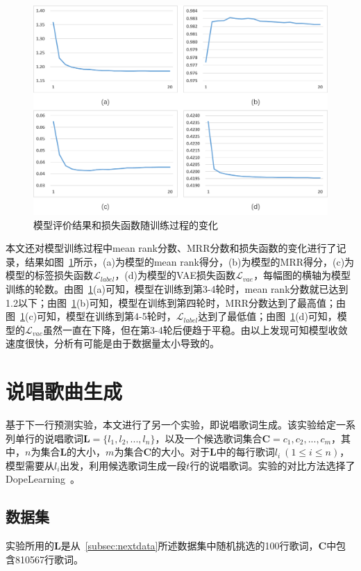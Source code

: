 \begin{figure}[h]
    \centering
    \includegraphics[width=14cm]{epoch.png}
    \caption{模型评价结果和损失函数随训练过程的变化}
    \label{fig:epoch}
\end{figure}

本文还对模型训练过程中mean rank分数、MRR分数和损失函数的变化进行了记录，结果如图~\ref{fig:epoch}所示，(a)为模型的mean rank得分，(b)为模型的MRR得分，(c)为模型的标签损失函数$\mathcal L_{label}$，(d)为模型的VAE损失函数$\mathcal L_{vae}$，每幅图的横轴为模型训练的轮数。由图~\ref{fig:epoch}(a)可知，模型在训练到第3-4轮时，mean rank分数就已达到1.2以下；由图~\ref{fig:epoch}(b)可知，模型在训练到第四轮时，MRR分数达到了最高值；由图~\ref{fig:epoch}(c)可知，模型在训练到第4-5轮时，$\mathcal L_{label}$达到了最低值；由图~\ref{fig:epoch}(d)可知，模型的$\mathcal L_{vae}$虽然一直在下降，但在第3-4轮后便趋于平稳。由以上发现可知模型收敛速度很快，分析有可能是由于数据量太小导致的。\par

\section{说唱歌曲生成}
基于下一行预测实验，本文进行了另一个实验，即说唱歌词生成。该实验给定一系列单行的说唱歌词$\bm L = \{l_1, l_2, ... , l_n\}$，以及一个候选歌词集合$\bm C = {c_1, c_2, ..., c_m}$，其中，$n$为集合$\bm L$的大小，$m$为集合$\bm C$的大小。对于$\bm L$中的每行歌词$l_i~(1 \leq i \leq n)$，模型需要从$l_i$出发，利用候选歌词生成一段$t$行的说唱歌词。实验的对比方法选择了DopeLearning~\cite{Malmi2016dopelearning}。\par

\subsection{数据集}
实验所用的$\bm L$是从~\ref{subsec:nextdata}所述数据集中随机挑选的100行歌词，$\bm C$中包含810567行歌词。\par

